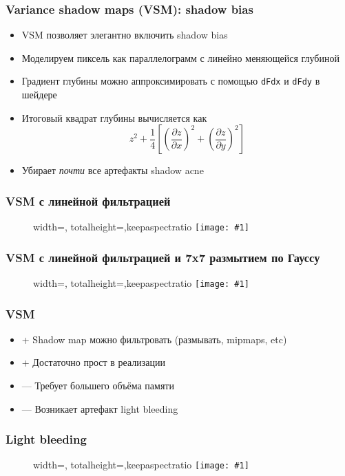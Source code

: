 \documentclass[10pt]{beamer}
\newcommand{\slideimage}[1]{
  \begin{figure}
    \begin{adjustbox}{width=\textwidth, totalheight=\textheight-2\baselineskip-2\baselineskip,keepaspectratio}
      \texttt{[image: \#1]}
    \end{adjustbox}
  \end{figure}
}
\begin{document}
\begin{frame}[fragile]
\frametitle{Variance shadow maps (VSM): shadow bias}
\begin{itemize}
\item VSM позволяет элегантно включить shadow bias
\pause
\item Моделируем пиксель как параллелограмм с линейно меняющейся глубиной
\pause
\item Градиент глубины можно аппроксимировать с помощью \verb|dFdx| и \verb|dFdy| в шейдере
\pause
\item Итоговый квадрат глубины вычисляется как
\begin{equation}
z^2 + \frac{1}{4}\left[\left(\frac{\partial z}{\partial x}\right)^2 + \left(\frac{\partial z}{\partial y}\right)^2\right]
\end{equation}
\pause
\item Убирает \textit{почти} все артефакты shadow acne
\end{itemize}
\end{frame}

\begin{frame}[fragile]
\frametitle{VSM с линейной фильтрацией}
\slideimage{vsm.png}
\end{frame}

\begin{frame}[fragile]
\frametitle{VSM с линейной фильтрацией и 7x7 размытием по Гауссу}
\slideimage{vsm_gauss.png}
\end{frame}

\begin{frame}[fragile]
\frametitle{VSM}
\begin{itemize}
\item {\color{green}+} Shadow map можно фильтровать (размывать, mipmaps, etc)
\item {\color{green}+} Достаточно прост в реализации
\item {\color{red}—} Требует большего объёма памяти
\item {\color{red}—} Возникает артефакт light bleeding
\end{itemize}
\end{frame}

\begin{frame}[fragile]
\frametitle{Light bleeding}
\slideimage{vsm_light_bleeding.png}
\end{frame}
\end{document}
